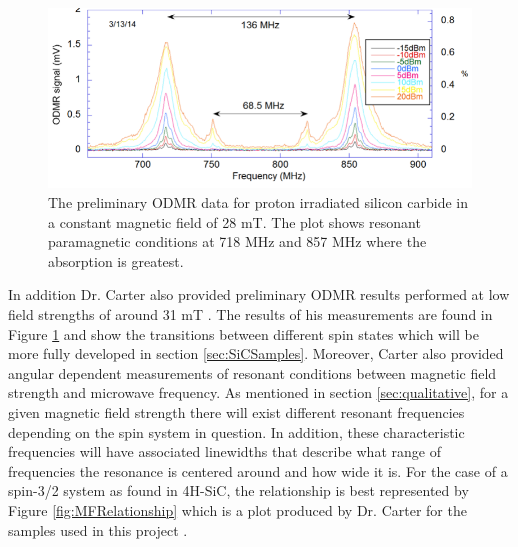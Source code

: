 \documentclass[oneside]{BYUPhys}
\begin{document}
\begin{figure}[t]
    \centerline{\includegraphics{prelim_odmr_fig}}
    \caption[Preliminary ODMR Data]{\label{fig:PrelimODMR}
     The preliminary ODMR data for proton irradiated silicon carbide in a constant magnetic field of 28 mT. The plot shows resonant paramagnetic conditions at 718 MHz and 857 MHz where the absorption is greatest.}
\end{figure}

In addition Dr. Carter also provided preliminary ODMR results performed at low field strengths of around 31 mT \cite{RefWorks:doc:5892964ee4b0499fa95c5108}. The results of his measurements are found in Figure \ref{fig:PrelimODMR} and show the transitions between different spin states which will be more fully developed in section \ref{sec:SiCSamples}. Moreover, Carter also provided angular dependent measurements of resonant conditions between magnetic field strength and microwave frequency. As mentioned in section \ref{sec:qualitative}, for a given magnetic field strength there will exist different resonant frequencies depending on the spin system in question. In addition, these characteristic frequencies will have associated linewidths that describe what range of frequencies the resonance is centered around and how wide it is. For the case of a spin-3/2 system as found in 4H-SiC, the relationship is best represented by Figure \ref{fig:MFRelationship} which is a plot produced by Dr. Carter for the samples used in this project \cite{RefWorks:doc:5892964ee4b0499fa95c5108}.
 
\end{document}
